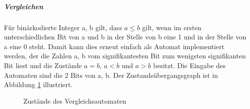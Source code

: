 \documentclass{article}
\begin{document}
\subparagraph{Vergleichen}
F\"ur bin\"arkodierte Integer a, b gilt, dass \(a \le b\) gilt,
wenn im ersten unterschiedlichen Bit von a und b in der Stelle von b eine 1 
und in der Stelle von a eine 0 steht. Damit kann dies erneut einfach als
Automat implementiert werden, der die Zahlen a, b vom signifikantesten
Bit zum wenigsten signifikanten Bit liest und die Zust\"ande 
\(a = b\), \(a < b\) und \(a > b\) besitzt. 
Die Eingabe des Automaten sind die 2 Bits von a, b. 
Der Zustands\"ubergangsgraph ist in Abbildung \ref{fig:state:compare}
illustriert. 
\begin{figure}
\centering
\label{fig:state:compare}
\caption{Zust\"ande des Vergleichsautomaten}
\end{figure}
\end{document}
